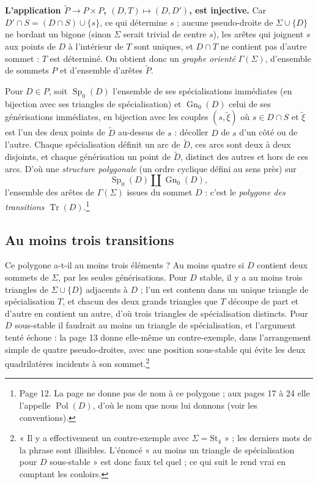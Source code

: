 \documentclass[11pt,a4paper]{article}
\begin{document}
\textbf{L'application $\widetilde{P} \to P \times P$, $(D, T) \mapsto (D, D')$,
est injective.} Car $D' \cap S = (D \cap S) \cup \lbrace s \rbrace$, ce qui
détermine $s$ ; aucune pseudo-droite de $\Sigma \cup \lbrace D \rbrace$ ne
bordant un bigone (sinon $\Sigma$ serait trivial de centre $s$), les arêtes qui
joignent $s$ aux points de $D$ à l'intérieur de $T$ sont uniques, et $D \cap T$
ne contient pas d'autre sommet : $T$ est déterminé. On obtient donc un
\emph{graphe orienté} $\Gamma(\Sigma)$, d'ensemble de sommets $P$ et
d'ensemble d'arêtes $\widetilde{P}$.

Pour $D \in P$, soit $\operatorname{Sp}_0(D)$ l'ensemble de ses spécialisations
immédiates (en bijection avec ses triangles de spécialisation) et
$\operatorname{Gn}_0(D)$ celui de ses générisations immédiates, en bijection
avec les couples $(s, \tilde{\xi})$ où $s \in D \cap S$ et $\tilde{\xi}$ est
l'un des deux points de $\widetilde{D}$ au-dessus de $s$ : décoller $D$ de $s$
d'un côté ou de l'autre. Chaque spécialisation définit un arc de
$\widetilde{D}$, ces arcs sont deux à deux disjoints, et chaque générisation un
point de $\widetilde{D}$, distinct des autres et hors de ces arcs. D'où une
\emph{structure polygonale} (un ordre cyclique défini au sens près) sur
\[
\operatorname{Sp}_0(D) \amalg \operatorname{Gn}_0(D),
\]
l'ensemble des arêtes de $\Gamma(\Sigma)$ issues du sommet $D$ : c'est le
\emph{polygone des transitions} $\operatorname{Tr}(D)$.\footnote{Page 12. La
page ne donne pas de nom à ce polygone ; aux pages 17 à 24 elle l'appelle
$\operatorname{Pol}(D)$, d'où le nom que nous lui donnons (voir les
conventions).}

\subsection*{Au moins trois transitions}

Ce polygone a-t-il au moins trois éléments ? Au moins quatre si $D$ contient
deux sommets de $\Sigma$, par les seules générisations. Pour $D$ stable, il y a
au moins trois triangles de $\Sigma \cup \lbrace D \rbrace$ adjacents à $D$ ;
l'un est contenu dans un unique triangle de spécialisation $T$, et chacun des
deux grands triangles que $T$ découpe de part et d'autre en contient un autre,
d'où trois triangles de spécialisation distincts. Pour $D$ sous-stable il
faudrait au moins un triangle de spécialisation, et l'argument tenté échoue :
la page 13 donne elle-même un contre-exemple, dans l'arrangement simple de
quatre pseudo-droites, avec une position sous-stable qui évite les deux
quadrilatères incidents à son sommet.\footnote{« Il y a effectivement un
contre-exemple avec $\Sigma = \mathrm{St}_4$ » ; les derniers mots de la phrase
sont illisibles. L'énoncé « au moins un triangle de spécialisation pour $D$
sous-stable » est donc faux tel quel ; ce qui suit le rend vrai en comptant les
couloirs.}
\end{document}
